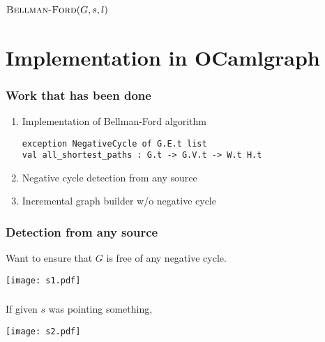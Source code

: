 \documentclass{beamer}
\begin{document}
\begin{frame}\frametitle{$ \mbox{\sc Bellman-Ford} (G,s,l) $}

\begin{algorithmic}[1]
\ENDFOR
\ENDFOR
{}
\ENDIF
\ENDFOR
{}
\end{algorithmic}

\cite[p.~532]{algo}

\end {frame}

\section{Implementation in OCamlgraph}

\begin{frame}[fragile]\frametitle{Work that has been done}

\begin{enumerate}
\item Implementation of Bellman-Ford algorithm

\begin{lstlisting}[language=caml]
exception NegativeCycle of G.E.t list
val all_shortest_paths : G.t -> G.V.t -> W.t H.t
\end{lstlisting}

\pause
\item Negative cycle detection from any source
\item Incremental graph builder w/o negative cycle
\end{enumerate}

\end{frame}


\begin{frame}\frametitle{Detection from any source}

Want to ensure that $G$ is free of any negative cycle.

\begin{center} \texttt{[image: s1.pdf]} \end{center}

\end{frame}


\begin{frame}\frametitle{}

If given $s$ was pointing something, 

\begin{center} \texttt{[image: s2.pdf]} \end{center}

\end{frame}
\end{document}
